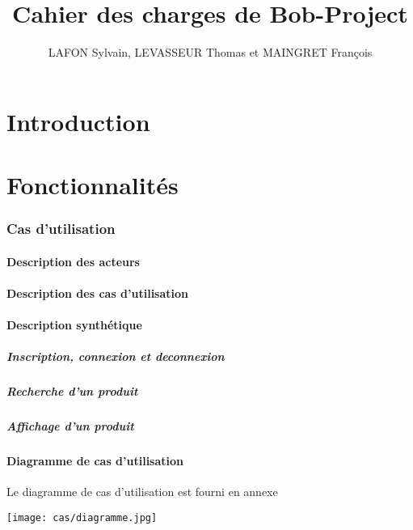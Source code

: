 \documentclass[10pt,a4paper]{article}
\title{Cahier des charges de Bob-Project}
\author{LAFON Sylvain, LEVASSEUR Thomas et MAINGRET François}
\begin{document}
	\maketitle
	\tableofcontents
	\newpage
	\part{Introduction}
		
	\newpage
	\part{Fonctionnalités}
		\section{Cas d'utilisation}
			\subsection{Description des acteurs}
				
			\subsection{Description des cas d'utilisation}
				
			\subsection{Description synthétique}
				\subsubsection{Inscription, connexion et deconnexion}
					
				\subsubsection{Recherche d'un produit}
					
				\subsubsection{Affichage d'un produit}
					
			\subsection{Diagramme de cas d'utilisation}
				Le diagramme de cas d'utilisation est fourni en annexe
				\newline
					
				\texttt{[image: cas/diagramme.jpg]}
	\newpage			
\end{document}
